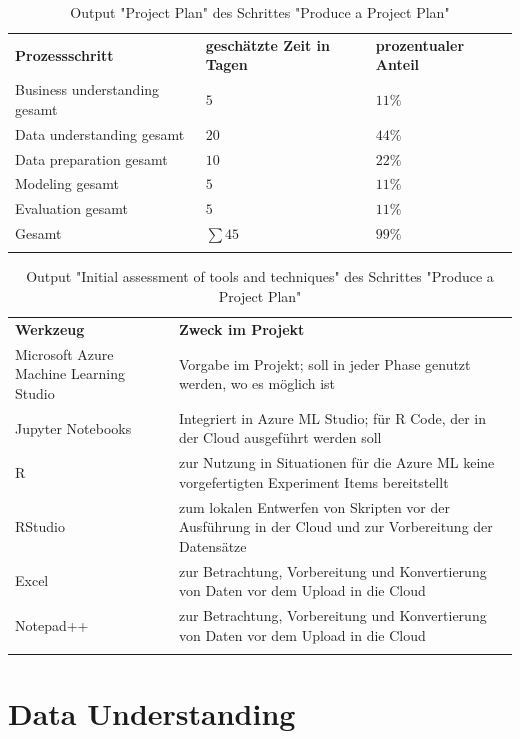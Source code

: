 \begin{centering} \footnotesize \begin{longtable}[!h]{|p{6cm}|p{4cm}|p{}|}
\hline
\textbf{Prozessschritt} & \textbf{geschätzte Zeit in Tagen} & \textbf{prozentualer Anteil} \\
\hhline{===}
Business understanding gesamt & $ 5$ &  $11 \%$ \\ \hline
Data understanding gesamt & $ 20$ &  $44 \%$ \\ \hline
Data preparation gesamt & $ 10$ &  $22 \%$ \\ \hline
Modeling gesamt & $ 5$ &  $11 \%$ \\ \hline
Evaluation gesamt & $ 5$ &  $11 \%$ \\ \hline
Gesamt & $\sum 45$ & $ 99 \%$ \\ \hline
\caption{Output "Project Plan" des Schrittes "Produce a Project Plan"}
\label{tab:projectPlan}
\end{longtable} \end{centering}
\begin{centering} \footnotesize \begin{longtable}[!h]{|p{4cm}|p{11cm}|}
\hline
\textbf{Werkzeug} & \textbf{Zweck im Projekt}\\ 
\hhline{==}
Microsoft Azure Machine Learning Studio & Vorgabe im Projekt; soll in jeder Phase genutzt werden, wo es möglich ist \\ \hline
Jupyter Notebooks & Integriert in Azure ML Studio; für R Code, der in der Cloud ausgeführt werden soll \\ \hline
R & zur Nutzung in Situationen für die Azure ML keine vorgefertigten Experiment Items bereitstellt \\ \hline
RStudio & zum lokalen Entwerfen von Skripten vor der Ausführung in der Cloud und zur Vorbereitung der Datensätze \\ \hline
Excel & zur Betrachtung, Vorbereitung und Konvertierung von Daten vor dem Upload in die Cloud \\ \hline
Notepad++ & zur Betrachtung, Vorbereitung und Konvertierung von Daten vor dem Upload in die Cloud \\ \hline
\caption{Output "Initial assessment of tools and techniques" des Schrittes "Produce a Project Plan"}
\end{longtable} \end{centering}

\section{Data Understanding}\label{sec:p2}
